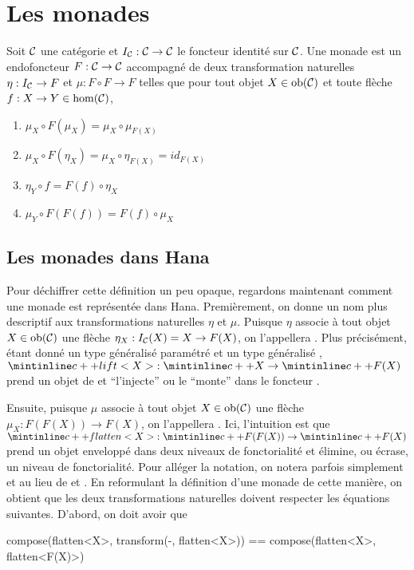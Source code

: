 \section{Les monades}


\begin{définition}[Monade]
    Soit $\mathcal{C}$ une catégorie et $I_{\mathcal{C}} : \mathcal{C} \to \mathcal{C}$ le foncteur identité sur
    $\mathcal{C}$. Une monade est un endofoncteur $F : \mathcal{C} \to \mathcal{C}$ accompagné de deux
    transformation naturelles $\eta : I_{\mathcal{C}} \to F$ et $\mu : F \circ F \to F$
    telles que pour tout objet $X \in \mathrm{ob}(\mathcal{C})$ et toute flèche
    $f : X \to Y \in \hom(\mathcal{C})$,
    \begin{enumerate}
        \item $\mu_X \circ F(\mu_X) = \mu_X \circ \mu_{F(X)}$
        \item $\mu_X \circ F(\eta_X) = \mu_X \circ \eta_{F(X)} = id_{F(X)}$
        \item $\eta_Y \circ f = F(f) \circ \eta_X$
        \item $\mu_Y \circ F(F(f)) = F(f) \circ \mu_X$
    \end{enumerate}
\end{définition}


\subsection{Les monades dans Hana}
Pour déchiffrer cette définition un peu opaque, regardons maintenant comment
une monade est représentée dans Hana. Premièrement, on donne un nom plus
descriptif aux transformations naturelles $\eta$ et $\mu$. Puisque $\eta$
associe à tout objet $X \in \mathrm{ob}(\mathcal{C})$ une flèche $\eta_X : I_{\mathcal{C}}(X) = X \to F(X)$,
on l'appellera . Plus précisément, étant donné un type généralisé
paramétré  et un type généralisé , $\cc{lift<X>} : \cc{X} \to \cc{F(X)}$
prend un objet de  et ``l'injecte'' ou le ``monte'' dans le foncteur .

Ensuite, puisque $\mu$ associe à tout objet $X \in \mathrm{ob}(\mathcal{C})$ une flèche
$\mu_X : F(F(X)) \to F(X)$, on l'appellera . Ici, l'intuition
est que $\cc{flatten<X>} : \cc{F(F(X))} \to \cc{F(X)}$ prend un objet
enveloppé dans deux niveaux de fonctorialité et élimine, ou écrase, un niveau
de fonctorialité. Pour alléger la notation, on notera parfois simplement
 et  au lieu de  et .
En reformulant la définition d'une monade de cette manière, on obtient que
les deux transformations naturelles doivent respecter les équations suivantes.
D'abord, on doit avoir que
\begin{cpp}
    compose(flatten<X>, transform(-, flatten<X>))
        == compose(flatten<X>, flatten<F(X)>)
\end{cpp}

